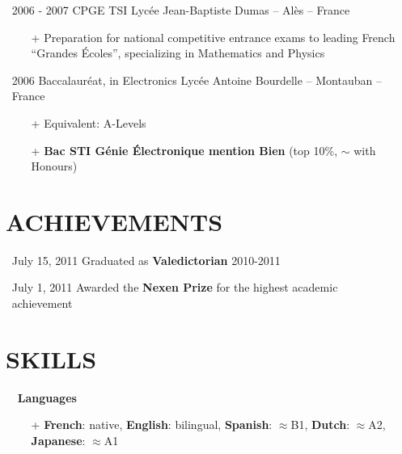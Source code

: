 \documentclass{res}
\begin{document}
\begin{resume}
\begin{itemize}
\item[] 2006 - 2007 \tabto{2cm} CPGE TSI \hfill Lyc\'ee Jean-Baptiste Dumas -- Al\`es -- France
        \begin{itemize}
                \item[+] Preparation for national competitive entrance exams to leading French ``Grandes \'Ecoles'', specializing in Mathematics and Physics
        \end{itemize}
        
\item[] 2006 \tabto{2cm} Baccalaur\'eat, in Electronics \hfill Lyc\'ee Antoine Bourdelle -- Montauban -- France
        \begin{itemize}
                \item[+] Equivalent: A-Levels
                \item[+] \textbf{Bac STI G\'enie \'Electronique mention Bien} (top 10\%, $\sim$ with Honours)
        \end{itemize}
\end{itemize}

\section{\faMedal~ACHIEVEMENTS}
\begin{itemize}
        \item[] July 15, 2011 \tabto{4cm} Graduated as \textbf{Valedictorian} 2010-2011
        \item[] July 1, 2011 \tabto{4cm} Awarded the \textbf{Nexen Prize} for the highest academic achievement
\end{itemize}


\section{\faLayerGroup~SKILLS}
        \begin{itemize}
                \item[] \faLanguage~\textbf{Languages}
                \begin{itemize}
                 \item[+]  \textbf{French}: native, \textbf{English}: bilingual, \textbf{Spanish}: $\approx$B1, \textbf{Dutch}: $\approx$A2, \textbf{Japanese}: $\approx$A1
                \end{itemize}   
        \end{itemize}
        

\end{resume}
\end{document}
